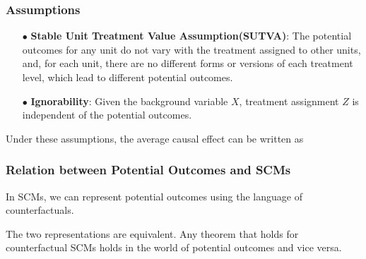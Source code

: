 \documentclass{beamer}
\begin{document}
\begin{frame}
    \frametitle{Assumptions}
    \begin{itemize}
        \item[$\bullet$] \textbf{Stable Unit Treatment Value Assumption(SUTVA)}: The potential outcomes for any unit do not 
        vary with the treatment assigned to other units, and, for each unit, there are no different forms or versions of each
        treatment level, which lead to different potential outcomes. \\
        \item[$\bullet$] \textbf{Ignorability}: Given the background variable $X$, treatment assignment $Z$ is independent of
        the potential outcomes. \\
    \end{itemize}
    \begin{flushleft}
        Under these assumptions, the average causal effect can be written as
    \end{flushleft}
\end{frame}

\begin{frame}
    \frametitle{Relation between Potential Outcomes and SCMs}
    \begin{flushleft}
        In SCMs, we can represent potential outcomes using the language of counterfactuals. 
    \end{flushleft}
    \begin{flushleft}
        The two representations are equivalent. Any theorem that holds for counterfactual SCMs holds
        in the world of potential outcomes and vice versa. 
    \end{flushleft}
\end{frame}
\end{document}
